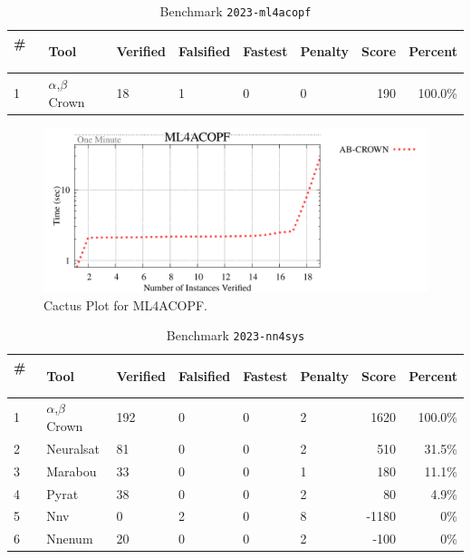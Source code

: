 
\begin{table}[h]
\begin{center}
\caption{Benchmark \texttt{2023-ml4acopf}} \label{tab:cat_{cat}}
{\setlength{\tabcolsep}{2pt}
\begin{tabular}[h]{@{}llllllrr@{}}
\toprule
\textbf{\# ~} & \textbf{Tool} & \textbf{Verified} & \textbf{Falsified} & \textbf{Fastest} & \textbf{Penalty} & \textbf{Score} & \textbf{Percent}\\
\midrule
1 & $\alpha$,$\beta$ Crown & 18 & 1 & 0 & 0 & 190 & 100.0\% \\
\bottomrule
\end{tabular}
}
\end{center}
\end{table}



\begin{figure}[h]
\centerline{\includegraphics[width=\textwidth]{cactus/2023_ml4acopf.pdf}}
\caption{Cactus Plot for ML4ACOPF.}
\label{fig:quantPic}
\end{figure}



\begin{table}[h]
\begin{center}
\caption{Benchmark \texttt{2023-nn4sys}} \label{tab:cat_{cat}}
{\setlength{\tabcolsep}{2pt}
\begin{tabular}[h]{@{}llllllrr@{}}
\toprule
\textbf{\# ~} & \textbf{Tool} & \textbf{Verified} & \textbf{Falsified} & \textbf{Fastest} & \textbf{Penalty} & \textbf{Score} & \textbf{Percent}\\
\midrule
1 & $\alpha$,$\beta$ Crown & 192 & 0 & 0 & 2 & 1620 & 100.0\% \\
2 & Neuralsat & 81 & 0 & 0 & 2 & 510 & 31.5\% \\
3 & Marabou & 33 & 0 & 0 & 1 & 180 & 11.1\% \\
4 & Pyrat & 38 & 0 & 0 & 2 & 80 & 4.9\% \\
5 & Nnv & 0 & 2 & 0 & 8 & -1180 & 0\% \\
6 & Nnenum & 20 & 0 & 0 & 2 & -100 & 0\% \\
\bottomrule
\end{tabular}
}
\end{center}
\end{table}



